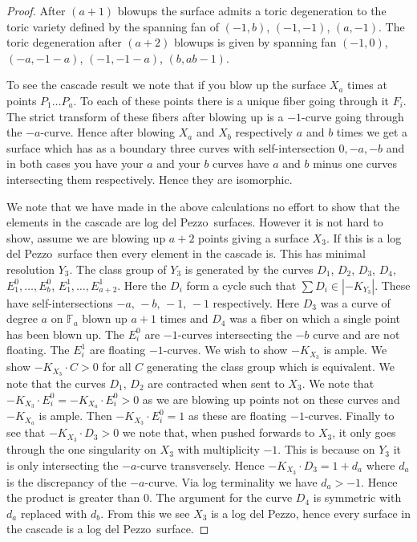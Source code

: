 \documentclass[12pt]{amsbook}
\theoremstyle{plain}
\newcommand{\ldp}{log del Pezzo}
\newcommand{\mb}[1]{\mathbb{#1}}
\begin{document}
\begin{proof}
 After $(a+1)$ blowups the surface admits a toric degeneration to the toric variety defined by the spanning fan of $(-1, b)$, $(-1, -1)$, $(a, -1)$. The toric degeneration after $(a+2)$ blowups is given by spanning fan $(-1,0)$, $(-a, -1-a)$, $(-1, -1-a)$, $(b, ab-1)$. 

To see the cascade result we note that if you blow up the surface $X_a$ times at points $P_1 \dots P_a$. To each of these points there is a unique fiber going through it $F_i$. The strict transform of these fibers after blowing up is a $-1$-curve going through the $-a$-curve. Hence after blowing $X_a$ and $X_b$ respectively $a$ and $b$ times we get a surface which has as a boundary three curves with self-intersection $0, -a, -b$ and in both cases you have your $a$ and your $b$ curves have $a$ and $b$ minus one curves intersecting them respectively. Hence they are isomorphic. 
 
 
We note that we have made in the above calculations no effort to show that the elements in the cascade are \ldp\ surfaces. However it is not hard to show, assume we are blowing up $a+2$ points giving a surface $X_3$. If this is a \ldp\ surface then every element in the cascade is. This has minimal resolution $Y_3$. The class group of $Y_3$ is generated by the curves $D_1$, $D_2$, $D_3$, $D_4$, $E_1^0, \dots, E_b^0$,  $E_1^1, \dots, E_{a+2}^1$. Here the $D_i$ form a cycle such that $\sum D_i \in |{-}K_{Y_3}|$. These have self-intersections $-a, \, -b, \, -1, \, -1$ respectively. Here $D_3$ was a curve of degree $a$  on $\mb{F}_a$ blown up $a+1$ times and $D_4$ was a fiber on which a single point has been blown up. The $E_i^0$ are $-1$-curves intersecting the $-b$ curve and are not floating. The $E_i^1$ are floating $-1$-curves. We wish to show ${-}K_{X_3}$ is ample. We show $-K_{X_3} \cdot C > 0$ for all $C$ generating the class group which is equivalent. We note that the curves $D_1, \, D_2$ are contracted when sent to $X_3$. We note that ${-}K_{X_3} \cdot E_i^0 = {-}K_{X_a} \cdot E_i^0 > 0$ as we are blowing up points not on these curves and ${-}K_{X_a}$ is ample. Then $-K_{X_3} \cdot E_i^0 = 1$ as these are floating $-1$-curves. Finally to see that $-K_{X_3} \cdot D_3 > 0$ we note that, when pushed forwards to $X_3$, it only goes through the one singularity on $X_3$ with multiplicity $-1$. This is because on $Y_3$ it is only intersecting the $-a$-curve transversely. Hence $-K_{X_3} \cdot D_3 = 1 + d_a$ where $d_a$ is the discrepancy of the $-a$-curve. Via log terminality we have $d_a > -1$. Hence the product is greater than 0. The argument for the curve $D_4$ is symmetric with $d_a$ replaced with $d_b$. From this we see $X_3$ is a \ldp, hence every surface in the cascade is a \ldp\ surface.
\end{proof}
\end{document}
